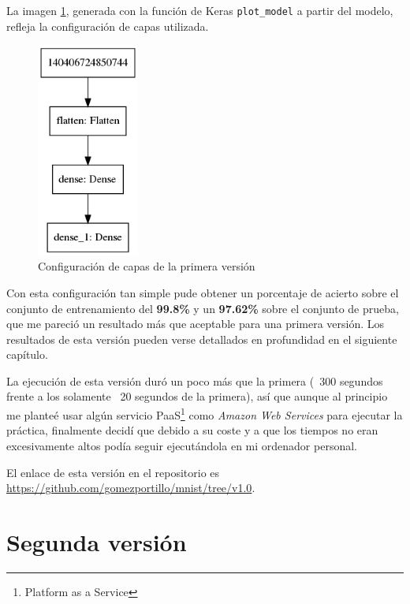 \bigskip

La imagen \ref{fig:capas-v1}, generada con la función de Keras \lstinline{plot_model} a partir del modelo, refleja la configuración de capas utilizada.

\bigskip

\begin{figure}[H]
  \centering
  \includegraphics[width=0.3\textwidth]{../images/model-v1}
  \caption{Configuración de capas de la primera versión}
  \label{fig:capas-v1}
\end{figure}

\bigskip

Con esta configuración tan simple pude obtener un porcentaje de acierto sobre el conjunto de entrenamiento del \textbf{99.8\%} y un \textbf{97.62\%} sobre el conjunto de prueba, que me pareció un resultado más que aceptable para una primera versión. Los resultados de esta versión pueden verse detallados en profundidad en el siguiente capítulo.

\bigskip

La ejecución de esta versión duró un poco más que la primera (~300 segundos frente a los solamente ~20 segundos de la primera), así que aunque al principio me planteé usar algún servicio PaaS\footnote{Platform as a Service} como \textit{Amazon Web Services} para ejecutar la práctica, finalmente decidí que debido a su coste y a que los tiempos no eran excesivamente altos podía seguir ejecutándola en mi ordenador personal.

\bigskip

El enlace de esta versión en el repositorio es \url{https://github.com/gomezportillo/mnist/tree/v1.0}.


\section{Segunda versión}

